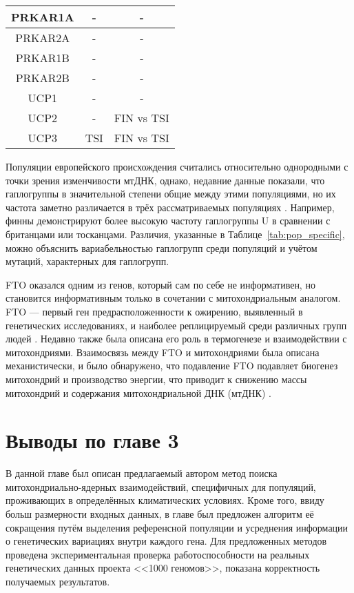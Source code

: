 \begin{table} [htbp]
\begin{threeparttable}
\begin{SingleSpace}
\begin{tabular}{| c | c | c |}
				PRKAR1A       & -                   & -           \\ \hline
				PRKAR2A       & -                   & -           \\ \hline
				PRKAR1B       & -                   & -           \\ \hline
				PRKAR2B       & -                   & -           \\ \hline
				UCP1          & -                   & -           \\ \hline
				UCP2          & -                   & FIN vs TSI  \\ \hline
				UCP3          & TSI                 & FIN vs TSI  \\ \hline
			\end{tabular}%
		\end{SingleSpace}
	\end{threeparttable}
\end{table}

Популяции европейского происхождения считались относительно однородными с точки зрения изменчивости мтДНК, однако, недавние данные показали, что гаплогруппы в значительной степени общие между этими популяциями, но их частота заметно различается в трёх рассматриваемых популяциях \autocite{Pinhasi2012}. Например, финны демонстрируют более высокую частоту гаплогруппы U в сравнении с британцами или тосканцами. Различия, указанные в Таблице~\ref{tab:pop_specific}, можно объяснить вариабельностью гаплогрупп среди популяций и учётом мутаций, характерных для гаплогрупп. 

FTO оказался одним из генов, который сам по себе не информативен, но становится информативным только в сочетании с митохондриальным аналогом. FTO --- первый ген предрасположенности к ожирению, выявленный в генетических исследованиях, и наиболее реплицируемый среди различных групп людей \autocite{Loos2013}. Недавно также была описана его роль в термогенезе и взаимодействии с митохондриями. Взаимосвязь между FTO и митохондриями была описана механистически, и было обнаружено, что подавление FTO подавляет биогенез митохондрий и производство энергии, что приводит к снижению массы митохондрий и содержания митохондриальной ДНК (мтДНК) \autocite{Kang2018}.

\section*{Выводы по главе 3} \label{sec:ch3/conclusion}                       

В данной главе был описан предлагаемый автором метод поиска митохондриально-ядерных взаимодействий, специфичных для популяций, проживающих в определённых климатических условиях. Кроме того, ввиду больш размерности входных данных, в главе был предложен алгоритм её сокращения путём выделения референсной популяции и усреднения информации о генетических вариациях внутри каждого гена. Для предложенных методов проведена экспериментальная проверка работоспособности на реальных генетических данных проекта <<1000 геномов>>, показана корректность получаемых результатов.
